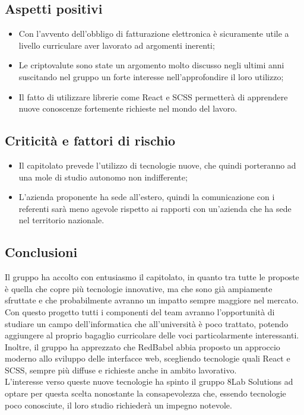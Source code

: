 \subsection{Aspetti positivi}
\begin{itemize}
	\item Con l'avvento dell'obbligo di fatturazione elettronica è sicuramente
	utile a livello curriculare aver lavorato ad argomenti inerenti;
	\item Le criptovalute sono state un argomento molto discusso negli ultimi anni 
suscitando nel gruppo un forte interesse nell'approfondire il loro utilizzo;
	
	\item Il fatto di utilizzare librerie come React e SCSS permetterà di
	apprendere nuove conoscenze fortemente richieste nel mondo del lavoro.
\end{itemize}


\subsection{Criticità  e fattori di rischio}

\begin{itemize}
	\item Il capitolato prevede l'utilizzo di tecnologie nuove, che quindi 
porteranno ad una mole di studio autonomo non indifferente;
	\item L'azienda proponente ha sede all'estero, quindi la comunicazione con i 
referenti sarà meno agevole rispetto ai rapporti con un'azienda che ha sede nel 
territorio nazionale.
\end{itemize}

\subsection{Conclusioni} Il gruppo ha accolto con entusiasmo il capitolato, in 
quanto tra tutte le proposte è quella che copre più tecnologie innovative, ma 
che sono già ampiamente sfruttate e che probabilmente avranno un impatto sempre 
maggiore nel mercato. Con questo progetto tutti i componenti del team avranno 
l'opportunità di studiare un campo dell'informatica che all'università è poco 
trattato, potendo aggiungere al proprio bagaglio curricolare delle voci 
particolarmente interessanti. Inoltre, il gruppo ha apprezzato che RedBabel abbia
proposto un approccio moderno allo sviluppo delle interfacce web, scegliendo 
tecnologie quali React e SCSS, sempre più diffuse e richieste anche in ambito lavorativo.\\
L'interesse verso queste nuove tecnologie ha spinto il gruppo 8Lab Solutions ad 
optare per questa scelta nonostante la consapevolezza che, essendo tecnologie 
poco conosciute, il loro studio richiederà un impegno notevole.



